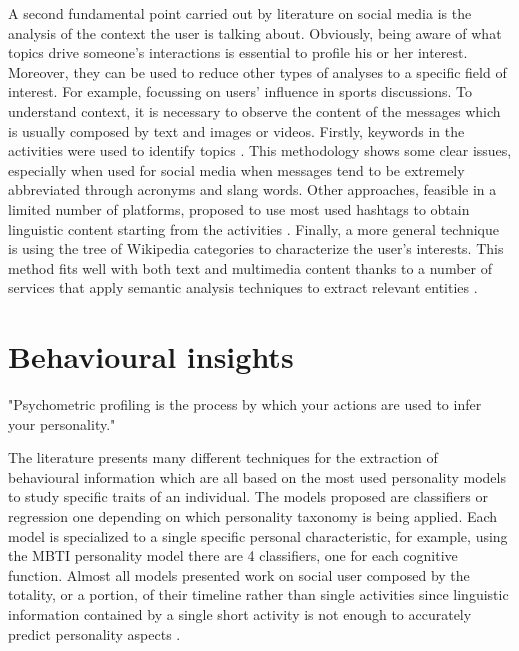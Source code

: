 A second fundamental point carried out by literature on social media is the analysis of the context the user is talking about.
Obviously, being aware of what topics drive someone's interactions is essential to profile his or her interest. 
Moreover, they can be used to reduce other types of analyses to a specific field of interest. For example, focussing on users' influence in sports discussions.
To understand context, it is necessary to observe the content of the messages which is usually composed by text and images or videos.
Firstly, keywords in the activities were used to identify topics \cite{cha2010measuring}. This methodology shows some clear issues, especially when used for social media when messages tend to be extremely abbreviated through acronyms and slang words.
Other approaches, feasible in a limited number of platforms, proposed to use most used hashtags to obtain linguistic content starting from the activities \cite{pennacchiotti2011machine}.
Finally, a more general technique is using the tree of Wikipedia categories to characterize the user's interests. 
This method fits well with both text and multimedia content thanks to a number of services that apply semantic analysis techniques to extract relevant entities \cite{torrero2018wikipedia}. 

\section{Behavioural insights}
"Psychometric profiling is the process by which your actions are used to infer your personality."

The literature presents many different techniques for the extraction of behavioural information which are all based on the most used personality models to study specific traits of an individual.
The models proposed are classifiers or regression one depending on which personality taxonomy is being applied.
Each model is specialized to a single specific personal characteristic, for example, using the MBTI personality model there are 4 classifiers, one for each cognitive function.
Almost all models presented work on social user composed by the totality, or a portion, of their timeline rather than single activities since linguistic information contained by a single short activity is not enough to accurately predict personality aspects \cite{mairesse2007using}.

